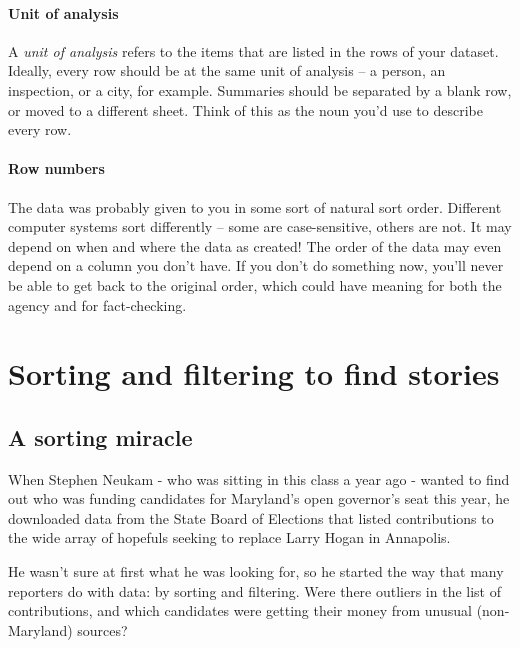 \documentclass[
  letterpaper,
  DIV=11,
  numbers=noendperiod]{scrreprt}
\begin{document}
\hypertarget{unit-of-analysis}{%
\subsubsection{Unit of analysis}\label{unit-of-analysis}}

A \emph{unit of analysis} refers to the items that are listed in the
rows of your dataset. Ideally, every row should be at the same unit of
analysis -- a person, an inspection, or a city, for example. Summaries
should be separated by a blank row, or moved to a different sheet. Think
of this as the noun you'd use to describe every row.

\hypertarget{row-numbers}{%
\subsubsection{Row numbers}\label{row-numbers}}

The data was probably given to you in some sort of natural sort order.
Different computer systems sort differently -- some are case-sensitive,
others are not. It may depend on when and where the data as created! The
order of the data may even depend on a column you don't have. If you
don't do something now, you'll never be able to get back to the original
order, which could have meaning for both the agency and for
fact-checking.


\hypertarget{sorting-and-filtering-to-find-stories}{%
\chapter{Sorting and filtering to find
stories}\label{sorting-and-filtering-to-find-stories}}

\hypertarget{a-sorting-miracle}{%
\section{A sorting miracle}\label{a-sorting-miracle}}

When Stephen Neukam - who was sitting in this class a year ago - wanted
to find out who was funding candidates for Maryland's open governor's
seat this year, he downloaded data from the State Board of Elections
that listed contributions to the wide array of hopefuls seeking to
replace Larry Hogan in Annapolis.

He wasn't sure at first what he was looking for, so he started the way
that many reporters do with data: by sorting and filtering. Were there
outliers in the list of contributions, and which candidates were getting
their money from unusual (non-Maryland) sources?
\end{document}
